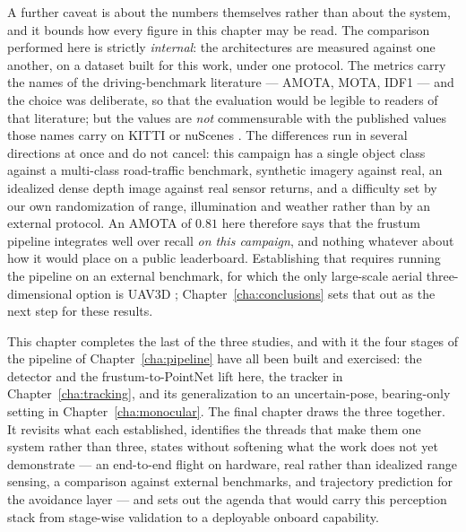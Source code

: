 A further caveat is about the numbers themselves rather than about the system, and
it bounds how every figure in this chapter may be read. The comparison performed
here is strictly \emph{internal}: the architectures are measured against one
another, on a dataset built for this work, under one protocol. The metrics carry
the names of the driving-benchmark literature --- AMOTA, MOTA, IDF1 --- and the
choice was deliberate, so that the evaluation would be legible to readers of that
literature; but the values are \emph{not} commensurable with the published values
those names carry on KITTI \cite{geiger2012kitti} or nuScenes
\cite{caesar2020nuscenes}. The differences run in several directions at once and
do not cancel: this campaign has a single object class against a multi-class
road-traffic benchmark, synthetic imagery against real, an idealized dense depth
image against real sensor returns, and a difficulty set by our own randomization of
range, illumination and weather rather than by an external protocol. An AMOTA of
$0.81$ here therefore says that the frustum pipeline integrates well over recall
\emph{on this campaign}, and nothing whatever about how it would place on a public
leaderboard. Establishing that requires running the pipeline on an external
benchmark, for which the only large-scale aerial three-dimensional option is
UAV3D \cite{ye2024uav3d}; Chapter~\ref{cha:conclusions} sets that out as the next
step for these results.

This chapter completes the last of the three studies, and with it the four stages
of the pipeline of Chapter~\ref{cha:pipeline} have all been built and exercised:
the detector and the frustum-to-PointNet lift here, the tracker in
Chapter~\ref{cha:tracking}, and its generalization to an uncertain-pose,
bearing-only setting in Chapter~\ref{cha:monocular}. The final chapter draws the
three together. It revisits what each established, identifies the threads that
make them one system rather than three, states without softening what the work
does not yet demonstrate --- an end-to-end flight on hardware, real rather than
idealized range sensing, a comparison against external benchmarks, and trajectory
prediction for the avoidance layer --- and sets out the agenda that would carry
this perception stack from stage-wise validation to a deployable onboard
capability.
